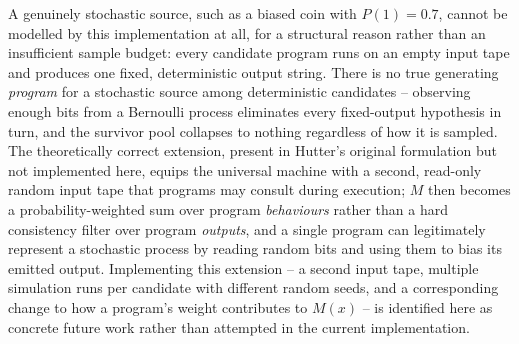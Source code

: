 \documentclass[11pt]{article}
\begin{document}
A genuinely stochastic source, such as a biased coin with $P(1)=0.7$, cannot be modelled
by this implementation at all, for a structural reason rather than an insufficient sample
budget: every candidate program runs on an empty input tape and produces one fixed,
deterministic output string. There is no true generating \emph{program} for a stochastic
source among deterministic candidates -- observing enough bits from a Bernoulli process
eliminates every fixed-output hypothesis in turn, and the survivor pool collapses to
nothing regardless of how it is sampled. The theoretically correct extension, present in
Hutter's original formulation but not implemented here, equips the universal machine with
a second, read-only random input tape that programs may consult during execution; $M$
then becomes a probability-weighted sum over program \emph{behaviours} rather than a hard
consistency filter over program \emph{outputs}, and a single program can legitimately
represent a stochastic process by reading random bits and using them to bias its emitted
output. Implementing this extension -- a second input tape, multiple simulation runs per
candidate with different random seeds, and a corresponding change to how a program's
weight contributes to $M(x)$ -- is identified here as concrete future work rather than
attempted in the current implementation.
\end{document}
